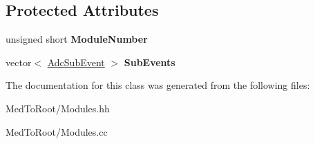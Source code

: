 \subsection*{Protected Attributes}
\begin{DoxyCompactItemize}
\item 
\mbox{\label{class_adc_module_a43a09a684ccb5fc37747241697f269ee}} 
unsigned short {\bfseries Module\+Number}
\item 
\mbox{\label{class_adc_module_adb2c7c6afe959590bf3ab8df284b4518}} 
vector$<$ \hyperlink{class_adc_sub_event}{Adc\+Sub\+Event} $>$ {\bfseries Sub\+Events}
\end{DoxyCompactItemize}


The documentation for this class was generated from the following files\+:\begin{DoxyCompactItemize}
\item 
Med\+To\+Root/Modules.\+hh\item 
Med\+To\+Root/Modules.\+cc\end{DoxyCompactItemize}
